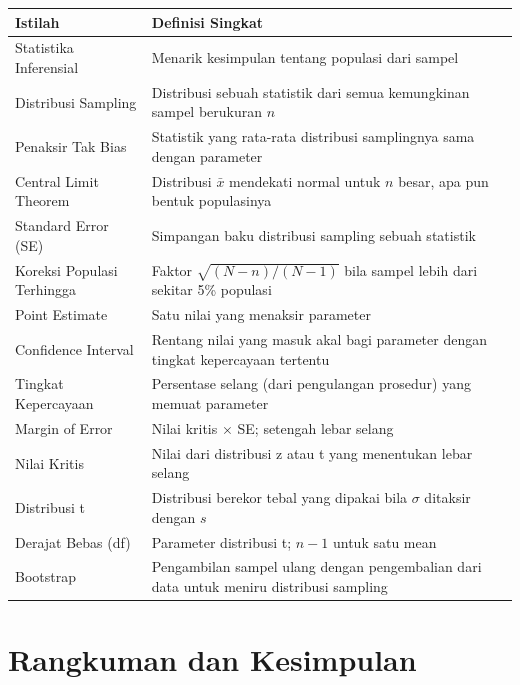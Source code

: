 \documentclass[
  indonesian,
  letterpaper,
]{book}
\newcounter{none} %
\begin{document}
{\def\LTcaptype{none} %
\begin{longtable}[]{@{}
  >{\raggedright\arraybackslash}p{}
  >{\raggedright\arraybackslash}p{}@{}}
\toprule\noalign{}
\begin{minipage}[b]{\linewidth}\raggedright
Istilah
\end{minipage} & \begin{minipage}[b]{\linewidth}\raggedright
Definisi Singkat
\end{minipage} \\
\midrule\noalign{}
\endhead
\bottomrule\noalign{}
\endlastfoot
Statistika Inferensial & Menarik kesimpulan tentang populasi dari
sampel \\
Distribusi Sampling & Distribusi sebuah statistik dari semua kemungkinan
sampel berukuran \(n\) \\
Penaksir Tak Bias & Statistik yang rata-rata distribusi samplingnya sama
dengan parameter \\
Central Limit Theorem & Distribusi \(\bar{x}\) mendekati normal untuk
\(n\) besar, apa pun bentuk populasinya \\
Standard Error (SE) & Simpangan baku distribusi sampling sebuah
statistik \\
Koreksi Populasi Terhingga & Faktor \(\sqrt{(N-n)/(N-1)}\) bila sampel
lebih dari sekitar 5\% populasi \\
Point Estimate & Satu nilai yang menaksir parameter \\
Confidence Interval & Rentang nilai yang masuk akal bagi parameter
dengan tingkat kepercayaan tertentu \\
Tingkat Kepercayaan & Persentase selang (dari pengulangan prosedur) yang
memuat parameter \\
Margin of Error & Nilai kritis \(\times\) SE; setengah lebar selang \\
Nilai Kritis & Nilai dari distribusi z atau t yang menentukan lebar
selang \\
Distribusi t & Distribusi berekor tebal yang dipakai bila \(\sigma\)
ditaksir dengan \(s\) \\
Derajat Bebas (df) & Parameter distribusi t; \(n-1\) untuk satu mean \\
Bootstrap & Pengambilan sampel ulang dengan pengembalian dari data untuk
meniru distribusi sampling \\
\end{longtable}
}

\section{Rangkuman dan Kesimpulan}\label{rangkuman-dan-kesimpulan}
\end{document}
